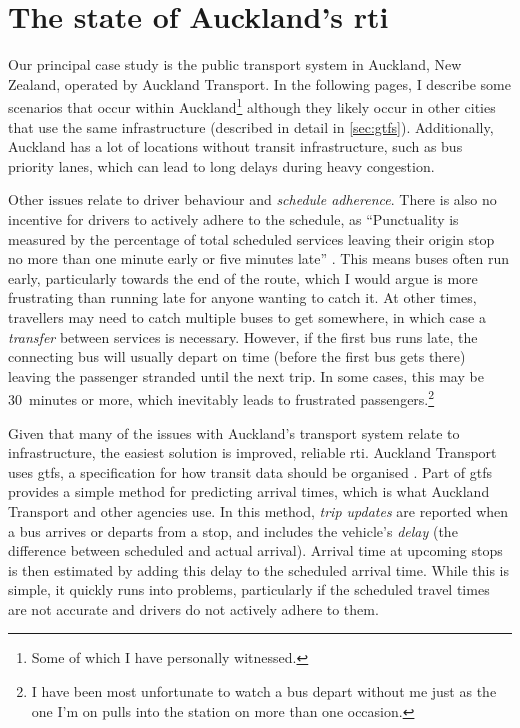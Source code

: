 \section{The state of Auckland's \gls{rti}}
\label{sec:auckland_etas}

Our principal case study is the public transport system in Auckland, New Zealand, operated by Auckland Transport. In the following pages, I describe some scenarios that occur within Auckland\footnote{Some of which I have personally witnessed.} although they likely occur in other cities that use the same infrastructure (described in detail in \cref{sec:gtfs}). Additionally, Auckland has a lot of locations without transit infrastructure, such as bus priority lanes, which can lead to long delays during heavy congestion.


Other issues relate to driver behaviour and \emph{schedule adherence}. There is also no incentive for drivers to actively adhere to the schedule, as ``Punctuality is measured by the percentage of total scheduled services leaving their origin stop no more than one minute early or five minutes late'' \citep[13]{AT_report_2019}. This means buses often run early, particularly towards the end of the route, which I would argue is more frustrating than running late for anyone wanting to catch it. At other times, travellers may need to catch multiple buses to get somewhere, in which case a \emph{transfer} between services is necessary. However, if the first bus runs late, the connecting bus will usually depart on time (before the first bus gets there) leaving the passenger stranded until the next trip. In some cases, this may be 30~minutes or more, which inevitably leads to frustrated passengers.\footnote{I have been most unfortunate to watch a bus depart without me just as the one I'm on pulls into the station on more than one occasion.}


Given that many of the issues with Auckland's transport system relate to infrastructure, the easiest solution is improved, reliable \gls{rti}. Auckland Transport uses \gls{gtfs}, a specification for how transit data should be organised \citep{GoogleDevelopers_2006}. Part of \gls{gtfs} provides a simple method for predicting arrival times, which is what Auckland Transport and other agencies use. In this method, \emph{trip updates} are reported when a bus arrives or departs from a stop, and includes the vehicle's \emph{delay} (the difference between scheduled and actual arrival). Arrival time at upcoming stops is then estimated by adding this delay to the scheduled arrival time. While this is simple, it quickly runs into problems, particularly if the scheduled travel times are not accurate and drivers do not actively adhere to them.


